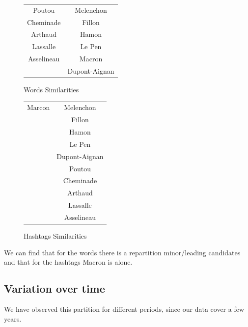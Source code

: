\documentclass[a4paper]{article}
\theoremstyle{definition}
\begin{document}
\begin{figure}
\begin{center}
\begin{multicols}{2}
\label{fig:image3}
\begin{tabular}{ | c | c |}
\hline
Poutou & Melenchon\\
Cheminade & Fillon\\
Arthaud & Hamon\\
Lassalle & Le Pen\\
Asselineau & Macron\\
& Dupont-Aignan\\
\hline
\end{tabular}
\caption{Words Similarities}
\bigskip

\begin{tabular}{ | c | c |}
\hline
Marcon & Melenchon\\
& Fillon\\
& Hamon\\
& Le Pen\\
& Dupont-Aignan\\
& Poutou\\
& Cheminade\\
& Arthaud \\
& Lassalle \\
& Asselineau \\
\hline
\end{tabular}
\bigskip
\caption{Hashtags Similarities}
\end{multicols}
\end{center}
\end{figure}

We can find that for the words there is a repartition minor/leading candidates and that for the hashtags Macron is alone.

\subsection{Variation over time}
We have observed this partition for different periods, since our data cover a few years.
\end{document}
